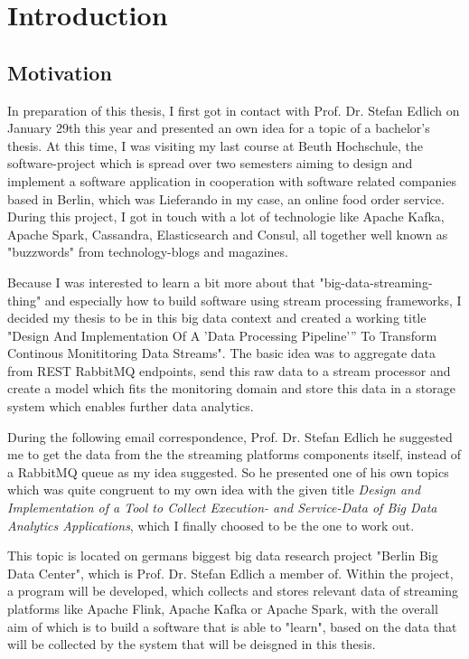 \chapter{Introduction}

\section{Motivation}

In preparation of this thesis, I first got in contact with Prof. Dr. Stefan Edlich on January 29th
this year and presented an own idea for a topic of a bachelor's thesis. At this time, I was
visiting my last course at Beuth Hochschule, the software-project which is spread over two semesters
aiming to design and implement a software application in cooperation with software related companies
based in Berlin, which was Lieferando in my case, an online food order service. During this project,
I got in touch with a lot of technologie like Apache Kafka, Apache Spark, Cassandra, Elasticsearch
and Consul, all together well known as "buzzwords" from technology-blogs and magazines.

Because I was interested to learn a bit more about that "big-data-streaming-thing" and especially how
to build software using stream processing frameworks, I decided my thesis to be in this big data context
and created a working title "Design And Implementation Of A 'Data Processing Pipeline'” To Transform
Continous Monititoring Data Streams". The basic idea was to aggregate data from REST RabbitMQ endpoints,
send this raw data to a stream processor and create a model which fits the monitoring domain and store
this data in a storage system which enables further data analytics.

During the following email correspondence, Prof. Dr. Stefan Edlich he suggested me to get the data
from the the streaming platforms components itself, instead of a RabbitMQ queue as my idea suggested.
So he presented one of his own topics which was quite congruent to my own idea with the given title
\textit{Design and Implementation of a Tool to Collect Execution- and Service-Data of Big Data Analytics
Applications}, which I finally choosed to be the one to work out.

This topic is located on germans biggest big data research project "Berlin Big Data Center", which is
Prof. Dr. Stefan Edlich a member of. Within the project, a program will be developed, which collects
and stores relevant data of streaming platforms like Apache Flink, Apache Kafka or Apache Spark,
with the overall aim of which is to build a software that is able to "learn", based on the data that
will be collected by the system that will be deisgned in this thesis.


